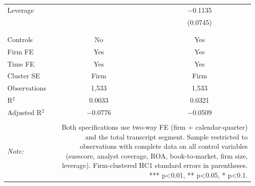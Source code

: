 \begin{table}[!htbp]
\begin{tabular}{@{\extracolsep{5pt}}lcc}
 Leverage &  & $-$0.1135 \\ 
  &  & (0.0745) \\ 
  & & \\ 
\hline \\[-1.8ex] 
Controls & No & Yes \\ 
Firm FE & Yes & Yes \\ 
Time FE & Yes & Yes \\ 
Cluster SE & Firm & Firm \\ 
Observations & 1,533 & 1,533 \\ 
R$^{2}$ & 0.0033 & 0.0321 \\ 
Adjusted R$^{2}$ & $-$0.0776 & $-$0.0509 \\ 
\hline 
\hline \\[-1.8ex] 
\textit{Note:}  & \multicolumn{2}{r}{Both specifications use two-way FE (firm + calendar-quarter) and the total transcript segment. Sample restricted to observations with complete data on all control variables (suescore, analyst coverage, ROA, book-to-market, firm size, leverage). Firm-clustered HC1 standard errors in parentheses. *** p<0.01, ** p<0.05, * p<0.1.} \\ 
\end{tabular} 
\end{table} 
